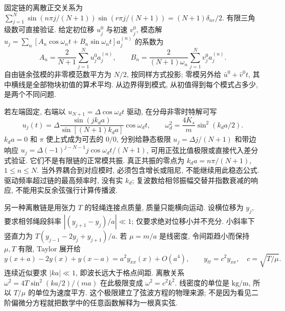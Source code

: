 固定链的离散正交关系为 $\sum_{j=1}^N\sin(n\pi j/(N+1))\sin(r\pi j/(N+1))=(N+1)\delta_{nr}/2$. 有限三角级数可直接验证. 给定初位移 $u_j^0$ 与初速 $v_j^0$, 模态解 $u_j=\sum_n[A_n\cos\omega_nt+B_n\sin\omega_nt]a_j^{(n)}$ 的系数为
\[
A_n=\frac2{N+1}\sum_{j=1}^Nu_j^0a_j^{(n)},\qquad
B_n=\frac2{(N+1)\omega_n}\sum_{j=1}^Nv_j^0a_j^{(n)}.
\]
自由链余弦模的非零模范数平方为 $N/2$, 按同样方式投影; 零模另外给 $\bar u^0+\bar v^0t$, 其中横线是全部物块初值的算术平均. 从边界得到模式, 从初值得到每个模式占多少, 是两个不同问题.

若左端固定, 右端以 $u_{N+1}=\Delta\cos\omega_dt$ 驱动, 在分母非零时特解可写
\[
u_j(t)=\Delta\frac{\sin(jk_da)}{\sin[(N+1)k_da]}\cos\omega_dt,
\qquad \omega_d^2=\frac{4K_s}{m}\sin^2(k_da/2).
\]
$k_da=0$ 和 $\pi$ 使上式成为可去的 $0/0$, 分别给静态极限 $u_j=\Delta j/(N+1)$ 和带边响应 $u_j=\Delta(-1)^{j-N-1}j\cos\omega_dt/(N+1)$, 可用正弦比值极限或直接代入差分式验证. 它们不是有限链的正常模共振. 真正共振的零点为 $k_da=n\pi/(N+1)$, $1\le n\le N$. 当外界耦合到对应模时, 必须包含增长或阻尼, 不能继续用此稳态公式. 驱动频率超过链的最高频率时, 没有实 $k_d$; 复波数给相邻振幅交替并指数衰减的响应, 不能用实反余弦强行计算传播波.

另一种离散链是用张力 $T$ 的轻绳连接点质量, 质量只能横向运动. 设横位移为 $y_j$, 要求相邻绳段斜率 $|(y_{j+1}-y_j)/a|\ll1$; 仅要求绝对位移小并不充分. 小斜率下竖直力为 $T(y_{j-1}-2y_j+y_{j+1})/a$. 若 $\mu=m/a$ 是线密度, 令间距趋小而保持 $\mu,T$ 有限, Taylor 展开给
\[
y(x+a)-2y(x)+y(x-a)=a^2y_{xx}(x)+O(a^4),\qquad
 y_{tt}=c^2y_{xx},\quad c=\sqrt{T/\mu}.
\]
连续近似要求 $|ka|\ll1$, 即波长远大于格点间距. 离散关系 $\omega^2=4T\sin^2(ka/2)/(ma)$ 在此极限变成 $\omega^2=c^2k^2$. 线密度的单位是 $\mathrm{kg/m}$, 所以 $T/\mu$ 的单位为速度平方. 这个极限建立了弦波方程的物理来源; 不是因为看见二阶偏微分方程就把数学中的任意函数解释为一根真实弦.
